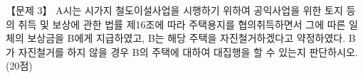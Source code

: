 \begin{longquestion}{【문제 3】}
A시는 시가지 철도이설사업을 시행하기 위하여 공익사업을 위한 토지 등의 취득 및 보상에 관한 법률 제16조에 따라 주택용지를 협의취득하면서 그에 따른 일체의 보상금을 B에게 지급하였고, B는 해당 주택을 자진철거하겠다고 약정하였다. B가 자진철거를 하지 않을 경우 B의 주택에 대하여 대집행을 할 수 있는지 판단하시오. (20점) \par
\end{longquestion}
